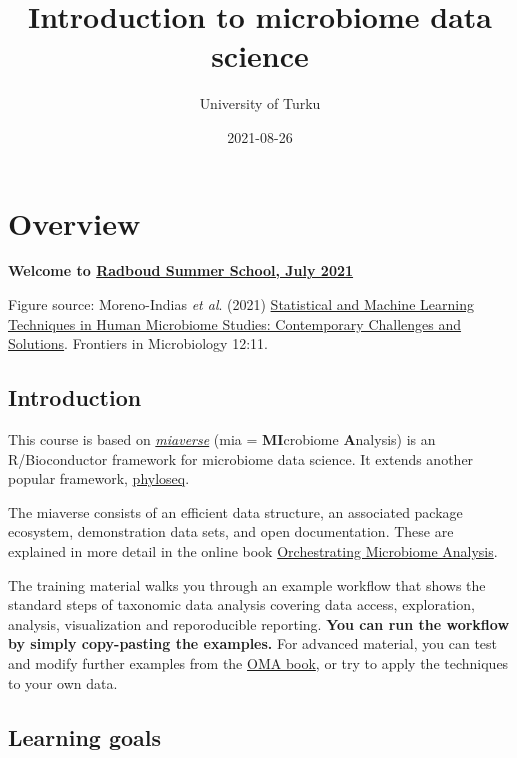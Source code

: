 \documentclass[
  oneside]{book}
\title{Introduction to microbiome data science}
\author{University of Turku}
\date{2021-08-26}
\begin{document}
\maketitle

{
\setcounter{tocdepth}{1}
\tableofcontents
}
\hypertarget{overview}{%
\chapter{Overview}\label{overview}}

\textbf{Welcome to \href{https://www.ru.nl/radboudsummerschool/courses/2021/brain-bacteria-behaviour/}{Radboud Summer School, July 2021}}

Figure source: Moreno-Indias \emph{et al}. (2021) \href{https://doi.org/10.3389/fmicb.2021.635781}{Statistical and Machine Learning Techniques in Human Microbiome Studies: Contemporary Challenges and Solutions}. Frontiers in Microbiology 12:11.

\hypertarget{introduction}{%
\section{Introduction}\label{introduction}}

This course is based on \href{https://microbiome.github.io}{\emph{miaverse}} (mia = \textbf{MI}crobiome \textbf{A}nalysis) is an
R/Bioconductor framework for microbiome data science. It extends another popular framework, \href{https://joey711.github.io/phyloseq/}{phyloseq}.

The miaverse consists of an efficient data structure, an
associated package ecosystem, demonstration data sets, and open
documentation. These are explained in more detail in the online book
\href{https://microbiome.github.io/OMA}{Orchestrating Microbiome Analysis}.

The training material walks you through an example workflow that
shows the standard steps of taxonomic data analysis covering data
access, exploration, analysis, visualization and reporoducible
reporting. \textbf{You can run the workflow by simply copy-pasting the
examples.} For advanced material, you can test and modify further
examples from the \href{https://microbiome.github.io/OMA}{OMA book}, or try
to apply the techniques to your own data.

\hypertarget{learning-goals}{%
\section{Learning goals}\label{learning-goals}}
\end{document}
